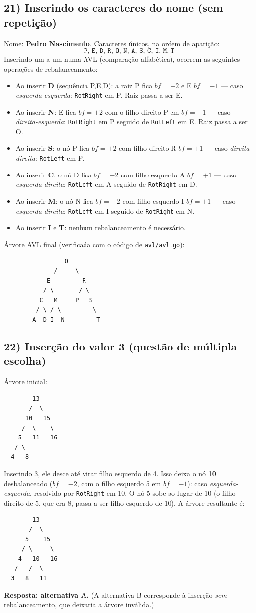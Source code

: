 \documentclass[11pt,a4paper]{article}
\begin{document}
\subsection*{21) Inserindo os caracteres do nome (sem repetição)}
Nome: \textbf{Pedro Nascimento}. Caracteres únicos, na ordem de aparição:
\[
  \texttt{P,\ E,\ D,\ R,\ O,\ N,\ A,\ S,\ C,\ I,\ M,\ T}
\]
Inserindo um a um numa AVL (comparação alfabética), ocorrem as seguintes operações de
rebalanceamento:
\begin{itemize}[noitemsep]
  \item Ao inserir \textbf{D} (sequência P,E,D): a raiz P fica $bf=-2$ e E $bf=-1$ ---
        caso \emph{esquerda-esquerda}: \texttt{RotRight} em P. Raiz passa a ser E.
  \item Ao inserir \textbf{N}: E fica $bf=+2$ com o filho direito P em $bf=-1$ ---
        caso \emph{direita-esquerda}: \texttt{RotRight} em P seguido de \texttt{RotLeft} em E.
        Raiz passa a ser O.
  \item Ao inserir \textbf{S}: o nó P fica $bf=+2$ com filho direito R $bf=+1$ ---
        caso \emph{direita-direita}: \texttt{RotLeft} em P.
  \item Ao inserir \textbf{C}: o nó D fica $bf=-2$ com filho esquerdo A $bf=+1$ ---
        caso \emph{esquerda-direita}: \texttt{RotLeft} em A seguido de \texttt{RotRight} em D.
  \item Ao inserir \textbf{M}: o nó N fica $bf=-2$ com filho esquerdo I $bf=+1$ ---
        caso \emph{esquerda-direita}: \texttt{RotLeft} em I seguido de \texttt{RotRight} em N.
  \item Ao inserir \textbf{I} e \textbf{T}: nenhum rebalanceamento é necessário.
\end{itemize}
Árvore AVL final (verificada com o código de \texttt{avl/avl.go}):
\begin{Verbatim}
                 O
              /     \
            E         R
           / \       / \
          C   M     P   S
         / \ / \         \
        A  D I  N         T
\end{Verbatim}

\subsection*{22) Inserção do valor 3 (questão de múltipla escolha)}
Árvore inicial:
\begin{Verbatim}
        13
       /  \
      10   15
     /  \    \
    5   11   16
   / \
  4   8
\end{Verbatim}
Inserindo 3, ele desce até virar filho esquerdo de 4. Isso deixa o nó \textbf{10} desbalanceado
($bf=-2$, com o filho esquerdo 5 em $bf=-1$): caso \emph{esquerda-esquerda}, resolvido por
\texttt{RotRight} em 10. O nó 5 sobe ao lugar de 10 (o filho direito de 5, que era 8, passa a
ser filho esquerdo de 10). A árvore resultante é:
\begin{Verbatim}
        13
       /  \
      5    15
     / \     \
    4   10   16
   /   /  \
  3   8   11
\end{Verbatim}
\textbf{Resposta: alternativa A.} (A alternativa B corresponde à inserção \emph{sem}
rebalanceamento, que deixaria a árvore inválida.)
\end{document}
